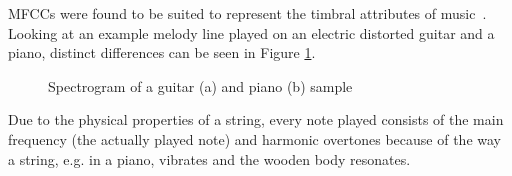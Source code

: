 \noindent MFCCs were found to be suited to represent the timbral attributes of music~\cite[pp. 55 ff]{knees1}. Looking at an example melody line played on an electric distorted guitar and a piano, distinct differences can be seen in Figure \ref{fig:timbre}. 
\begin{figure}[htbp]
	\centering
	\caption{Spectrogram of a guitar (a) and piano (b) sample}	
	\label{fig:timbre}
\end{figure}
\FloatBarrier
\noindent Due to the physical properties of a string, every note played consists of the main frequency (the actually played note) and harmonic overtones because of the way a string, e.g. in a piano, vibrates and the wooden body resonates. 
